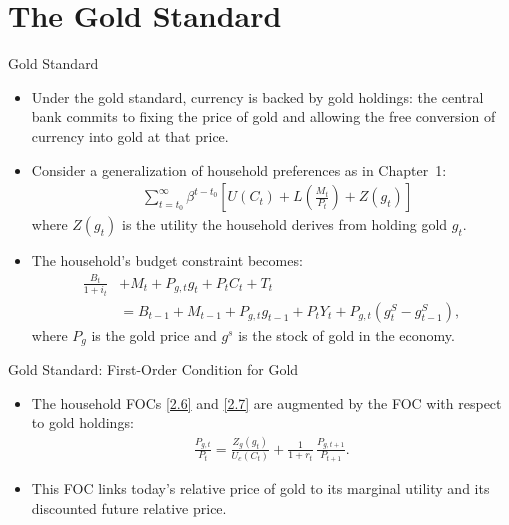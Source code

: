 \documentclass[11pt,aspectratio=169]{beamer}
\begin{document}
\section{The Gold Standard}

\begin{frame}{Gold Standard}
\small
\begin{itemize}

    \item Under the gold standard, currency is backed by gold holdings:  
    the central bank commits to fixing the price of gold and allowing the free conversion  
    of currency into gold at that price. 

    \vspace{0.6em}

    \item Consider a generalization of household preferences as in Chapter~1:
    \begin{align*}
        &\sum_{t = t_0}^{\infty} 
        \beta^{t - t_0} 
        \left[ 
            U(C_t) 
            + L\left( \frac{M_t}{P_t} \right) 
            + Z(g_t) 
        \right]
    \end{align*}
where $Z(g_t)$ is the utility the household derives from holding gold $g_t$. 
    \vspace{0.6em}

    \item The household’s budget constraint becomes:
    \begin{align*}
        \frac{B_t}{1 + i_t} 
        &+ M_t 
        + P_{g,t} g_t 
        + P_t C_t 
        + T_t  \\
        &= B_{t-1} 
        + M_{t-1} 
        + P_{g,t} g_{t-1} 
        + P_t Y_t 
        + P_{g,t} (g_t^S - g_{t-1}^S),
    \end{align*}
where $P_g$ is the gold price and $g^s$ is the stock of gold in the economy.
\end{itemize}
\end{frame}

\begin{frame}{Gold Standard: First-Order Condition for Gold}
\small
\begin{itemize}

    \item The household FOCs \eqref{2.6} and \eqref{2.7} are augmented by the FOC with respect to gold holdings:
    \begin{align}
        \frac{P_{g,t}}{P_t} 
        = \frac{Z_g(g_t)}{U_c(C_t)} 
        + \frac{1}{1+r_t}\,
        \frac{P_{g,t+1}}{P_{t+1}}.
        \tag{2.28}\label{2.28}
    \end{align}

    \vspace{1em}

    \item This FOC links today’s relative price of gold to its marginal utility and its discounted future relative price.  
\end{itemize}
\end{frame}
\end{document}
